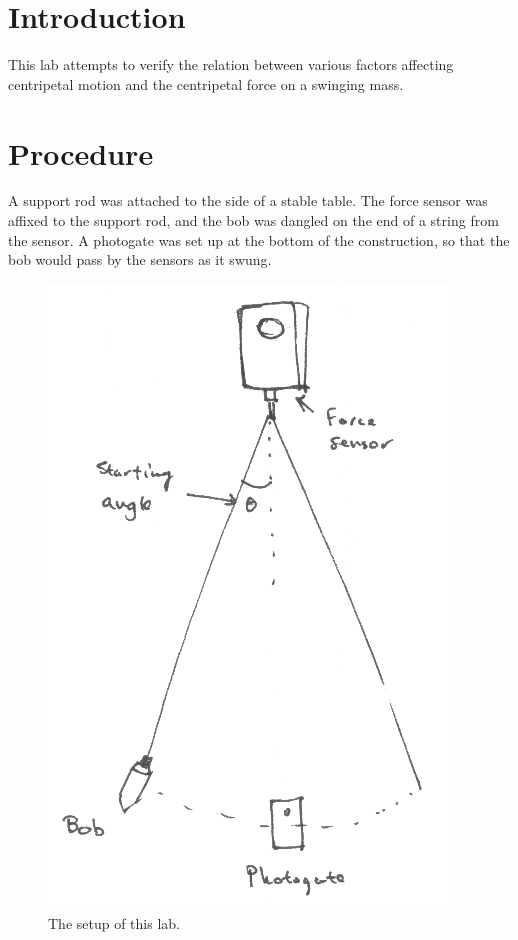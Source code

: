 \section{Introduction}

This lab attempts to verify the relation between various factors affecting centripetal motion and the centripetal force on a swinging mass.

\section{Procedure}

A support rod was attached to the side of a stable table.
The force sensor was affixed to the support rod, and the bob was dangled on the end of a string from the sensor.
A photogate was set up at the bottom of the construction, so that the bob would pass by the sensors as it swung.

\begin{figure}[h]

\begin{center}
\includegraphics[scale=0.3]{content/fig1}
\end{center}

\caption{The setup of this lab.}

\end{figure}

